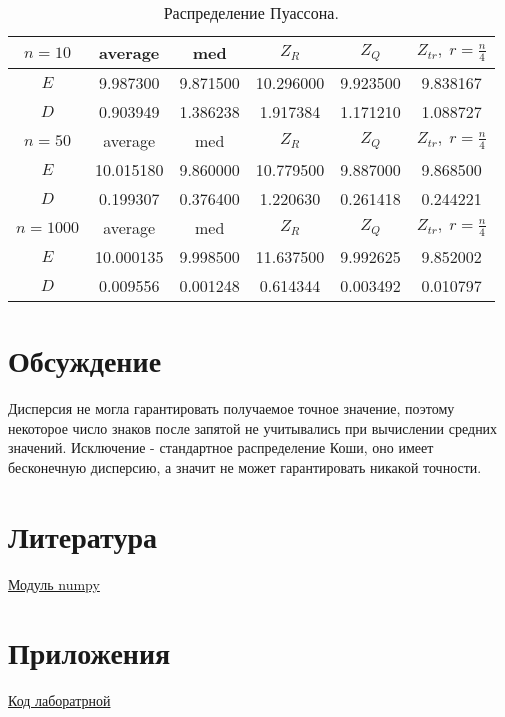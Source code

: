 \documentclass[a4]{article}
\begin{document}
		\begin{table}[h]
			\caption{ Распределение Пуассона.}
			\begin{center}
				\begin{tabular}{|c|c|c|c|c|c|}
					\hline
					$n = 10$  & average & med & $Z_R$ & $Z_Q$ & $Z_{tr},\;r=\frac{n}{4}$\\ \hline
					$E$      & 9.987300         & 9.871500         & 10.296000        & 9.923500         & 9.838167         \\ \hline
					$D$      & 0.903949         & 1.386238         & 1.917384         & 1.171210         & 1.088727         \\ \hline
					\hline
					$n = 50$ & average & med & $Z_R$ & $Z_Q$ & $Z_{tr},\;r=\frac{n}{4}$\\ \hline
					$E$      & 10.015180        & 9.860000         & 10.779500        & 9.887000         & 9.868500         \\ \hline
					$D$      & 0.199307         & 0.376400         & 1.220630         & 0.261418         & 0.244221         \\ \hline
					\hline
					$n =1000$ & average & med & $Z_R$ & $Z_Q$ & $Z_{tr},\;r=\frac{n}{4}$\\ \hline
					$E$      & 10.000135        & 9.998500         & 11.637500        & 9.992625         & 9.852002         \\ \hline
					$D$      & 0.009556         & 0.001248         & 0.614344         & 0.003492         & 0.010797         \\ \hline
				\end{tabular}
			\end{center}
		\end{table}
		\newpage
			
	\section{Обсуждение}
		\par Дисперсия не могла гарантировать получаемое точное значение, поэтому некоторое число знаков после запятой не учитывались при вычислении средних значений. Исключение - стандартное распределение Коши, оно имеет бесконечную дисперсию, а значит не может гарантировать никакой точности.
		
	\section{Литература}
	
	\href{https://numpy.org/doc/stable/index.html}{Модуль numpy}
	
	\section{Приложения}
	
	\href{https://github.com/Sergey-Sharapov/MatStat_labs/blob/main/lab2/lab2.py}{Код лаборатрной}
	
	
\end{document}
